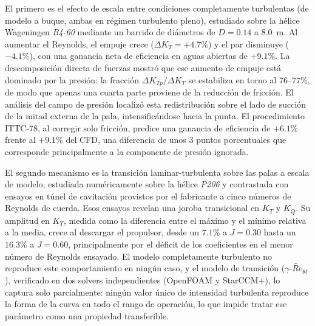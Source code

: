 El primero es el efecto de escala entre condiciones completamente turbulentas (de
modelo a buque, ambas en régimen turbulento pleno), estudiado sobre la hélice
Wageningen \textit{B4-60} mediante un barrido de diámetros de $D = 0{.}14$ a $8{.}0$~m. Al
aumentar el Reynolds, el empuje crece ($\Delta K_T = +4{.}7\%$) y el par disminuye
($-4{.}1\%$), con una ganancia neta de eficiencia en aguas abiertas de $+9{.}1\%$.
La descomposición directa de fuerzas mostró que ese aumento de empuje está dominado
por la presión: la fracción $\Delta K_{Tp}/\Delta K_T$ se estabiliza en torno al
$76$--$77\%$, de modo que apenas una cuarta parte proviene de la reducción de
fricción. El análisis del campo de presión localizó esta redistribución sobre el
lado de succión de la mitad externa de la pala, intensificándose hacia la punta. El
procedimiento ITTC-78, al corregir solo fricción, predice una ganancia de eficiencia
de $+6{.}1\%$ frente al $+9{.}1\%$ del CFD, una diferencia de unos $3$ puntos
porcentuales que corresponde principalmente a la componente de presión ignorada.

El segundo mecanismo es la transición laminar-turbulenta sobre las palas a escala de
modelo, estudiada numéricamente sobre la hélice \textit{P206} y contrastada con ensayos en
túnel de cavitación provistos por el fabricante a cinco números de Reynolds de
cuerda. Esos ensayos revelan una joroba transicional
en $K_T$ y $K_Q$. Su amplitud en $K_T$, medida como la diferencia entre el máximo y
el mínimo relativa a la media, crece al descargar el propulsor, desde un $7{.}1\%$ a
$J = 0{.}30$ hasta un $16{.}3\%$ a $J = 0{.}60$, principalmente por el déficit de los
coeficientes en el menor número de Reynolds ensayado. El
modelo completamente turbulento no reproduce este comportamiento en ningún caso, y
el modelo de transición ($\gamma$-$\widetilde{Re}_{\theta t}$), verificado en dos
solvers independientes (OpenFOAM y StarCCM+), lo captura solo parcialmente: ningún
valor único de intensidad turbulenta reproduce la forma de la curva en todo el rango
de operación, lo que impide tratar ese parámetro como una propiedad transferible.


